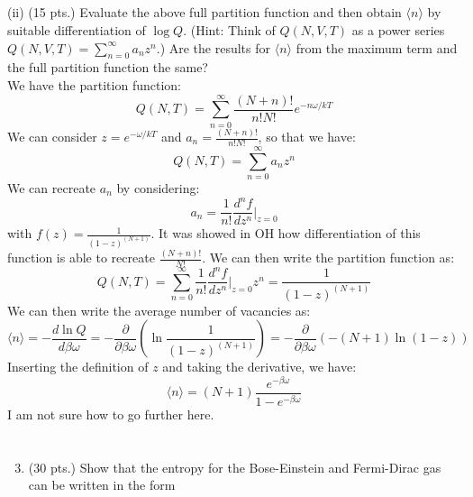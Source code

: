 \documentclass[12pt]{article}
\begin{document}
\subsection{}
(ii) (15 pts.) Evaluate the above full partition function and then obtain $\langle n\rangle$ by suitable differentiation of $\log Q$. (Hint: Think of $Q(N, V, T)$ as a power series $Q(N, V, T)=\sum_{n=0}^{\infty} a_{n} z^{n}$.) Are the results for $\langle n\rangle$ from the maximum term and the full partition function the same?\\
We have the partition function:
\begin{equation}
  Q(N,T)=\sum_{n=0}^{\infty}\frac{(N+n)!}{n!N!}e^{-n\omega/kT}
\end{equation}
We can consider $z=e^{-\omega/kT}$ and $a_{n}=\frac{(N+n)!}{n!N!}$, so that we have:
\begin{equation}
  Q(N,T)=\sum_{n=0}^{\infty} a_{n} z^{n}
\end{equation}
We can recreate $a_{n}$ by considering:
\begin{equation}
  a_{n}=\frac{1}{n!}\frac{d^n f}{dz^n}\bigg|_{z=0}
\end{equation}
with $f(z)=\frac{1}{(1-z)^{(N+1)}}$. It was showed in OH how differentiation of this function is able to recreate $\frac{(N+n)!}{N!}$. We can then write the partition function as:
\begin{equation}
  Q(N,T)=\sum_{n=0}^{\infty}\frac{1}{n!}\frac{d^n f}{dz^n}\bigg|_{z=0}z^{n} = \frac{1}{(1-z)^{(N+1)}}
\end{equation}
We can then write the average number of vacancies as:
\begin{equation}
  \langle n\rangle =-\frac{d \ln Q}{d \beta \omega} = -\frac{\partial}{\partial{\beta \omega}}\left( \ln \frac{1}{(1-z)^{(N+1)}}\right) = -\frac{\partial}{\partial{\beta \omega}}\left( -(N+1)\ln (1-z)\right)
\end{equation}
Inserting the definition of $z$ and taking the derivative, we have:
\begin{equation}
  \langle n\rangle = (N+1)\frac{e^{-\beta \omega}}{1-e^{-\beta \omega}}
\end{equation}
I am not sure how to go further here.

\section{}
\begin{enumerate}
  \setcounter{enumi}{2}
  \item (30 pts.) Show that the entropy for the Bose-Einstein and Fermi-Dirac gas can be written in the form
\end{enumerate}
\end{document}
